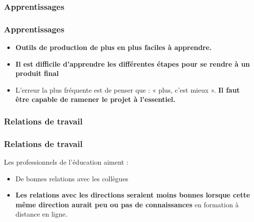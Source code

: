 					\subsubsection{Apprentissages} 
						\begin{frame}[allowframebreaks]
						\frametitle{Apprentissages}
                        			 
                        			\begin{itemize}
                        			\item \textbf{Outils de production de plus en plus faciles à apprendre. }
                        			\item \textbf{Il est difficile d'apprendre les différentes étapes pour se rendre à un produit final}
                        			\item L’erreur la plus fréquente est de penser que : « plus, c’est mieux ». \textbf{Il faut être capable de ramener le projet à l’essentiel.}

                        				
						\end{itemize}
						\end{frame}	
						
					\subsubsection{Relations de travail} 
						\begin{frame}[allowframebreaks]
						\frametitle{Relations de travail}
                        			Les professionnels de l'éducation aiment : 
                        			\begin{itemize}
                        			\item De bonnes relations avec les collègues
                        			\item \textbf{Les relations avec les directions seraient moins bonnes lorsque cette même direction aurait peu ou pas de connaissances} en formation à distance en ligne.

                        				
						\end{itemize}
						\end{frame}	
						
